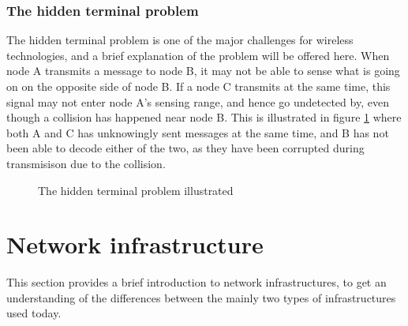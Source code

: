      \subsubsection{The hidden terminal problem}
     The hidden terminal problem is one of the major challenges for wireless technologies, and a brief explanation of the problem will be offered here.
		 When node A transmits a message to node B, it may not be able to sense what is going on
     on the opposite side of node B. If a node C transmits at the same time, this signal may not enter node A's sensing range, and
     hence go undetected by, even though a collision has happened near node B. This is illustrated in figure \ref{fig:hiddenterminal} where
     both A and C has unknowingly sent messages at the same time, and B has not been able to decode either of the two, as they have been corrupted during
		 transmisison due to the collision. 

     \begin{figure}
     \center

     \caption{The hidden terminal problem illustrated}
     \label{fig:hiddenterminal}
     \end{figure}


\section{Network infrastructure}
		This section provides a brief introduction to network infrastructures, to get an understanding of the differences between the mainly two types of infrastructures used today. 
